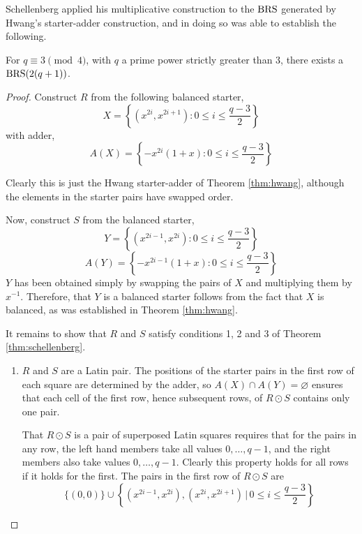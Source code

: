 Schellenberg applied his multiplicative construction to the $\operatorname{BRS}$ generated by Hwang’s starter-adder construction, and in doing so was able to establish the following.

\begin{theorem}
For $q \equiv 3\pmod 4$, with $q$ a prime power strictly greater than 3, there exists a $\operatorname{BRS}(2(q+1))$.
\end{theorem}

\begin{proof}
Construct $R$ from the following balanced starter,
\begin{equation}
X = \left \{ (x^{2i},x^{2i+1}):0 \leq i \leq \frac{q-3}{2} \right \}
\end{equation}
with adder,
\begin{equation}
A(X) = \left \{ -x^{2i}(1+x):0 \leq i \leq \frac{q-3}{2} \right \}
\end{equation}

Clearly this is just the Hwang starter-adder of Theorem \ref{thm:hwang}, although the elements in the starter pairs have swapped order.

Now, construct $S$ from the balanced starter,
\begin{equation}
Y = \left \{ (x^{2i-1},x^{2i}):0 \leq i \leq \frac{q-3}{2} \right \}
\end{equation}
\begin{equation}
A(Y) = \left \{ -x^{2i-1}(1+x):0 \leq i \leq \frac{q-3}{2} \right \}
\end{equation}
$Y$ has been obtained simply by swapping the pairs of $X$ and multiplying them by $x^{-1}$.
Therefore, that $Y$ is a balanced starter follows from the fact that $X$ is balanced, as was established in Theorem \ref{thm:hwang}.

It remains to show that $R$ and $S$ satisfy conditions 1, 2 and 3 of Theorem \ref{thm:schellenberg}.
\begin{enumerate}
  \item{$R$ and $S$ are a Latin pair. The positions of the
      starter pairs in the first row of each square are
      determined by the adder, so
      $A(X) \cap A(Y) = \varnothing$ ensures that each
      cell of the first row, hence subsequent rows, of
      $R \odot S$ contains only one pair.
      
      That $R \odot S$ is a pair of superposed Latin squares
      requires that for the pairs in any row, the left hand
      members take all values $0,\ldots, q - 1$, and the right
      members also take values $0,\ldots, q - 1$.  Clearly this
      property holds for all rows if it holds for the first.
      The pairs in the first row of $R \odot S$ are
      \begin{equation}
        \{(0, 0)\} \cup \left \{ (x^{2i - 1}, x^{2i}), (x^{2i}, x^{2i + 1}) \,|\, 0 \leq i \leq \frac{q - 3}{2} \right \}
      \end{equation}
      
}
\end{enumerate}
\end{proof}
